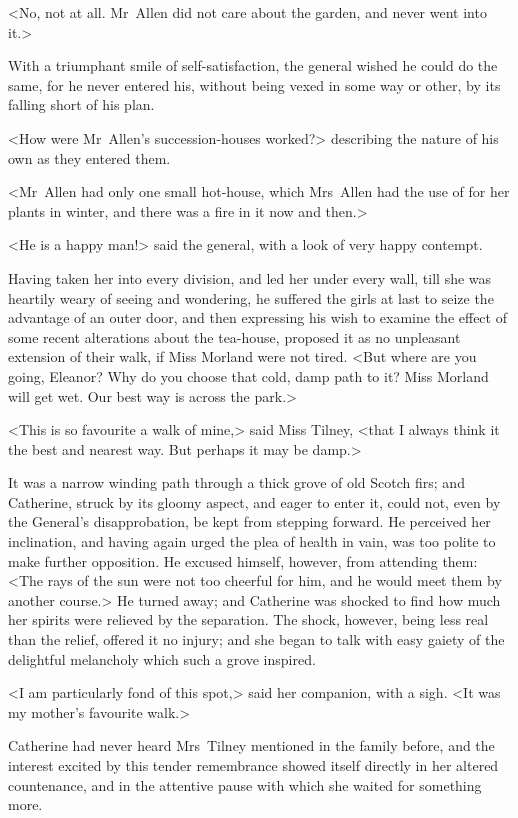  <No, not at all. Mr~Allen did not care about the garden, and never went into it.> 

 With a triumphant smile of self-satisfaction, the general wished he could do the same, for he never entered his, without being vexed in some way or other, by its falling short of his plan. 

 <How were Mr~Allen's succession-houses worked?> describing the nature of his own as they entered them. 

 <Mr~Allen had only one small hot-house, which Mrs~Allen had the use of for her plants in winter, and there was a fire in it now and then.> 

 <He is a happy man!> said the general, with a look of very happy contempt. 

 Having taken her into every division, and led her under every wall, till she was heartily weary of seeing and wondering, he suffered the girls at last to seize the advantage of an outer door, and then expressing his wish to examine the effect of some recent alterations about the tea-house, proposed it as no unpleasant extension of their walk, if Miss Morland were not tired. <But where are you going, Eleanor? Why do you choose that cold, damp path to it? Miss Morland will get wet. Our best way is across the park.> 

 <This is so favourite a walk of mine,> said Miss Tilney, <that I always think it the best and nearest way. But perhaps it may be damp.> 

 It was a narrow winding path through a thick grove of old Scotch firs; and Catherine, struck by its gloomy aspect, and eager to enter it, could not, even by the General's disapprobation, be kept from stepping forward. He perceived her inclination, and having again urged the plea of health in vain, was too polite to make further opposition. He excused himself, however, from attending them: <The rays of the sun were not too cheerful for him, and he would meet them by another course.> He turned away; and Catherine was shocked to find how much her spirits were relieved by the separation. The shock, however, being less real than the relief, offered it no injury; and she began to talk with easy gaiety of the delightful melancholy which such a grove inspired. 

 <I am particularly fond of this spot,> said her companion, with a sigh. <It was my mother's favourite walk.> 

 Catherine had never heard Mrs~Tilney mentioned in the family before, and the interest excited by this tender remembrance showed itself directly in her altered countenance, and in the attentive pause with which she waited for something more. 

